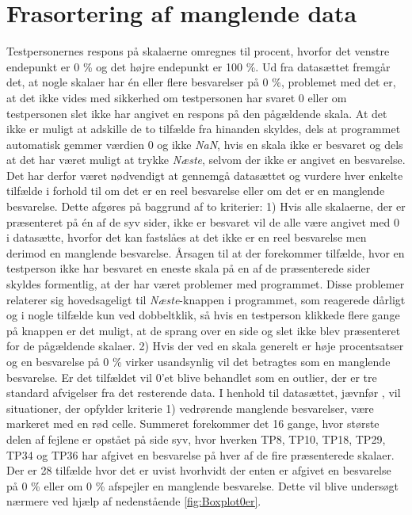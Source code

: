 \section{Frasortering af manglende data}
\label{TestAfSkalaSorteringAfData}
%
Testpersonernes respons på skalaerne omregnes til procent, hvorfor det venstre endepunkt er 0 \% og det højre endepunkt er 100 \%. Ud fra datasættet fremgår det, at nogle skalaer har én eller flere besvarelser på 0 \%, problemet med det er, at det ikke vides med sikkerhed om testpersonen har svaret 0 eller om testpersonen slet ikke har angivet en respons på den pågældende skala. At det ikke er muligt at adskille de to tilfælde fra hinanden skyldes, dels at programmet automatisk gemmer værdien 0 og ikke \textit{NaN}, hvis en skala ikke er besvaret og dels at det har været muligt at trykke \textit{Næste}, selvom der ikke er angivet en besvarelse. Det har derfor været nødvendigt at gennemgå datasættet og vurdere hver enkelte tilfælde i forhold til om det er en reel besvarelse eller om det er en manglende besvarelse. Dette afgøres på baggrund af to kriterier: 1) Hvis alle skalaerne, der er præsenteret på én af de syv sider, ikke er besvaret vil de alle være angivet med 0 i datasætte, hvorfor det kan fastslåes at det ikke er en reel besvarelse men derimod en manglende besvarelse. Årsagen til at der forekommer tilfælde, hvor en testperson ikke har besvaret en eneste skala på en af de præsenterede sider skyldes formentlig, at der har været problemer med programmet. Disse problemer relaterer sig hovedsageligt til \textit{Næste}-knappen i programmet, som reagerede dårligt og i nogle tilfælde kun ved dobbeltklik, så hvis en testperson klikkede flere gange på knappen er det muligt, at de sprang over en side og slet ikke blev præsenteret for de pågældende skalaer. 2) Hvis der ved en skala generelt er høje procentsatser og en besvarelse på 0 \% virker usandsynlig vil det betragtes som en manglende besvarelse. Er det tilfældet vil 0'et blive behandlet som en outlier, der er tre standard afvigelser fra det resterende data.\blankline
%
I henhold til datasættet, jævnfør , vil situationer, der opfylder kriterie 1) vedrørende manglende besvarelser, være markeret med en rød celle. Summeret forekommer det 16 gange, hvor største delen af fejlene er opstået på side syv, hvor hverken TP8, TP10, TP18, TP29, TP34 og TP36 har afgivet en besvarelse på hver af de fire præsenterede skalaer. \blankline
%
Der er 28 tilfælde hvor det er uvist hvorhvidt der enten er afgivet en besvarelse på 0 \% eller om 0 \% afspejler en manglende besvarelse. Dette vil blive undersøgt nærmere ved hjælp af nedenstående \autoref{fig:Boxplot0er}.

